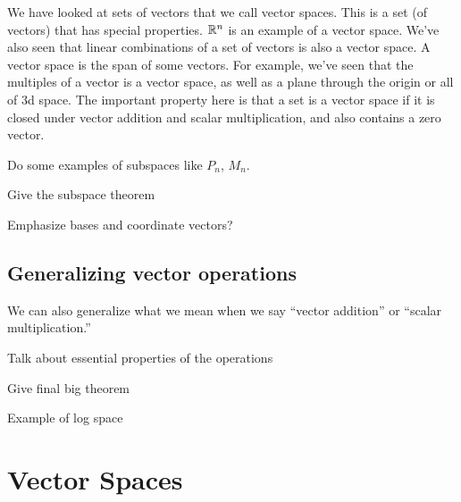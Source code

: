 We have looked at sets of vectors that we call vector spaces.  This is a set (of vectors) that has special properties.  $\mathbb{R}^n$ is an example of a vector space.  We've also seen that linear combinations of a set of vectors is also a vector space.  A vector space is the span of some vectors.  For example, we've seen that the multiples of a vector is a vector space, as well as a plane through the origin or all of 3d space.  The important property here is that a set is a vector space if it is closed under vector addition and scalar multiplication, and also contains a zero vector.

Do some examples of subspaces like $P_n$, $M_n$.

Give the subspace theorem

Emphasize bases and coordinate vectors?

\subsection{Generalizing vector operations}

We can also generalize what we mean when we say ``vector addition'' or ``scalar multiplication.''  

Talk about essential properties of the operations

Give final big theorem

Example of log space







\section{Vector Spaces}

